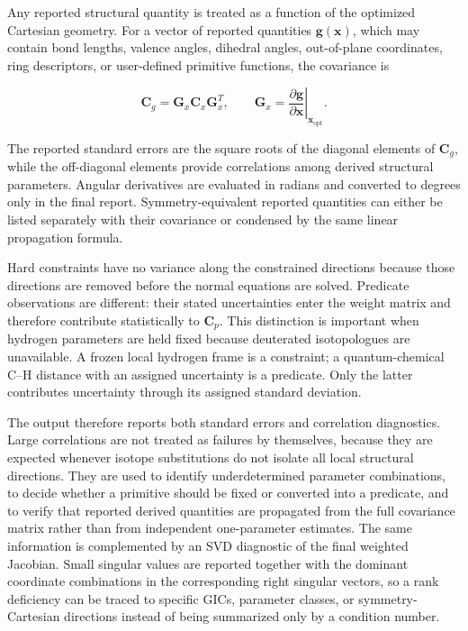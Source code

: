\documentclass[journal=jctcce,manuscript=article,maxauthors=999]{achemso}
\begin{document}
Any reported structural quantity is treated as a function of the optimized
Cartesian geometry. For a vector of reported quantities
$\mathbf{g}(\mathbf{x})$, which may contain bond lengths, valence angles,
dihedral angles, out-of-plane coordinates, ring descriptors, or user-defined
primitive functions, the covariance is

\begin{equation}
\mathbf{C}_{g}
=
\mathbf{G}_{x}
\mathbf{C}_{x}
\mathbf{G}_{x}^{T},
\qquad
\mathbf{G}_{x}
=
\left.
\frac{\partial\mathbf{g}}
{\partial\mathbf{x}}
\right|_{\mathbf{x}_{\mathrm{opt}}}.
\end{equation}

The reported standard errors are the square roots of the diagonal elements of
$\mathbf{C}_{g}$, while the off-diagonal elements provide correlations among
derived structural parameters. Angular derivatives are evaluated in radians
and converted to degrees only in the final report. Symmetry-equivalent
reported quantities can either be listed separately with their covariance or
condensed by the same linear propagation formula.

Hard constraints have no variance along the constrained directions because
those directions are removed before the normal equations are solved. Predicate
observations are different: their stated uncertainties enter the weight matrix
and therefore contribute statistically to $\mathbf{C}_{p}$. This distinction is
important when hydrogen parameters are held fixed because deuterated
isotopologues are unavailable. A frozen local hydrogen frame is a constraint;
a quantum-chemical C--H distance with an assigned uncertainty is a predicate.
Only the latter contributes uncertainty through its assigned standard
deviation.

The output therefore reports both standard errors and correlation diagnostics.
Large correlations are not treated as failures by themselves, because they are
expected whenever isotope substitutions do not isolate all local structural
directions. They are used to identify underdetermined parameter combinations,
to decide whether a primitive should be fixed or converted into a predicate,
and to verify that reported derived quantities are propagated from the full
covariance matrix rather than from independent one-parameter estimates.
The same information is complemented by an SVD diagnostic of the final weighted
Jacobian. Small singular values are reported together with the dominant
coordinate combinations in the corresponding right singular vectors, so a rank
deficiency can be traced to specific GICs, parameter classes, or
symmetry-Cartesian directions instead of being summarized only by a condition
number.
\end{document}
